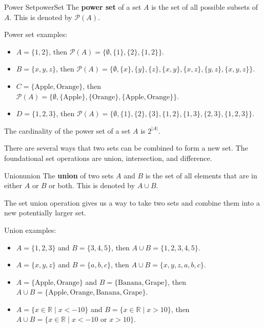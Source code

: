 \begin{definition}{Power Set}{powerSet}
  The \textbf{power set} of a set \( A \) is the set of all possible subsets of \( A \).
  This is denoted by \( \mathcal{P}(A) \).
\end{definition}

Power set examples:
\begin{itemize}
  \item \( A = \{ 1, 2 \} \), then \( \mathcal{P}(A) = \{ \emptyset, \{ 1 \}, \{ 2 \}, \{ 1, 2 \} \} \).
  \item \( B = \{ x, y, z \} \), then \( \mathcal{P}(A) = \{ \emptyset, \{ x \}, \{ y \}, \{ z \},
  \{ x, y \}, \{ x, z \}, \{ y, z \}, \{ x, y, z \} \} \).
  \item \( C = \{ \text{Apple}, \text{Orange} \} \), then \( \mathcal{P}(A) = \{ \emptyset,
  \{ \text{Apple} \}, \{ \text{Orange} \}, \{ \text{Apple}, \text{Orange} \} \} \).
  \item \( D = \{ 1, 2, 3 \} \), then \( \mathcal{P}(A) = \{ \emptyset, \{ 1 \}, \{ 2 \},
  \{ 3 \}, \{ 1, 2 \}, \{ 1, 3 \}, \{ 2, 3 \}, \{ 1, 2, 3 \} \} \).
\end{itemize}

The cardinality of the power set of a set \( A \) is \( 2^{|A|} \).

There are several ways that two sets can be combined to form a new set. The
foundational set operations are union, intersection, and difference.

\begin{definition}{Union}{union}
  The \textbf{union} of two sets \( A \) and \( B \) is the set of all elements
  that are in either \( A \) or \( B \) or both. This is denoted by \( A \cup B \).
\end{definition}

The set union operation gives us a way to take two sets and combine them into a new
potentially larger set.

Union examples:
\begin{itemize}
  \item \( A = \{ 1, 2, 3 \} \) and \( B = \{ 3, 4, 5 \} \), then \( A \cup B = \{ 1, 2, 3, 4, 5 \} \).
  \item \( A = \{ x, y, z \} \) and \( B = \{ a, b, c \} \), then \( A \cup B = \{ x, y, z, a, b, c \} \).
  \item \( A = \{ \text{Apple}, \text{Orange} \} \) and \( B = \{ \text{Banana}, \text{Grape} \} \), then
  \( A \cup B = \{ \text{Apple}, \text{Orange}, \text{Banana}, \text{Grape} \} \).
  \item \( A = \{ x \in \mathbb{R} \mid x < -10 \} \) and \( B = \{ x \in \mathbb{R} \mid x > 10 \} \), then
  \( A \cup B = \{ x \in \mathbb{R} \mid x < -10 \text{ or } x > 10 \} \).
\end{itemize}

